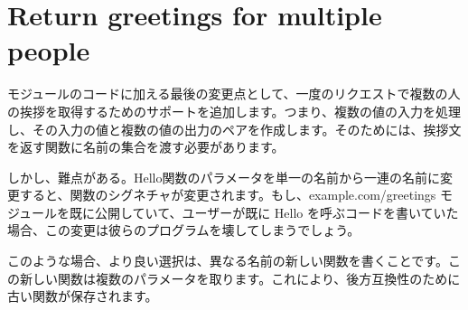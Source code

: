 \section{Return greetings for multiple people}

モジュールのコードに加える最後の変更点として、一度のリクエストで複数の人の挨拶を取得するためのサポートを追加します。つまり、複数の値の入力を処理し、その入力の値と複数の値の出力のペアを作成します。そのためには、挨拶文を返す関数に名前の集合を渡す必要があります。

しかし、難点がある。Hello関数のパラメータを単一の名前から一連の名前に変更すると、関数のシグネチャが変更されます。もし、example.com/greetings モジュールを既に公開していて、ユーザーが既に Hello を呼ぶコードを書いていた場合、この変更は彼らのプログラムを壊してしまうでしょう。

このような場合、より良い選択は、異なる名前の新しい関数を書くことです。この新しい関数は複数のパラメータを取ります。これにより、後方互換性のために古い関数が保存されます。

